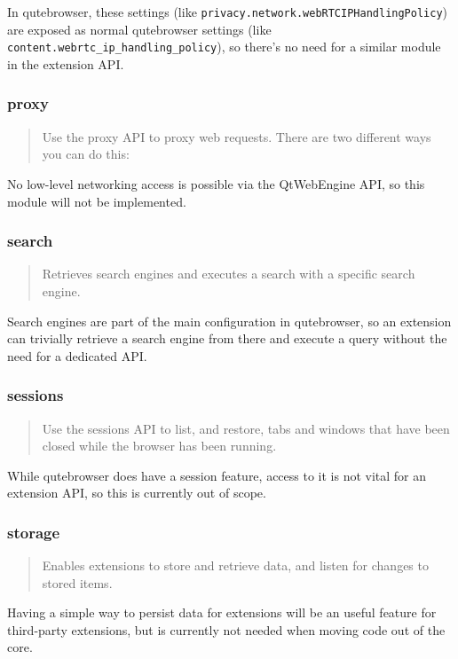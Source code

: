 In qutebrowser, these settings (like
\verb|privacy.network.webRTCIPHandlingPolicy|) are exposed as normal qutebrowser
settings (like \verb|content.webrtc_ip_handling_policy|), so there's no need
for a similar module in the extension API.

\subsubsection{proxy}
\begin{quote}
Use the proxy API to proxy web requests. There are two different ways you can do this:
\end{quote}

No low-level networking access is possible via the QtWebEngine API, so this
module will not be implemented.

\subsubsection{search}
\begin{quote}
Retrieves search engines and executes a search with a specific search engine.
\end{quote}

Search engines are part of the main configuration in qutebrowser, so an
extension can trivially retrieve a search engine from there and execute a query
without the need for a dedicated API.

\subsubsection{sessions}
\begin{quote}
Use the sessions API to list, and restore, tabs and windows that have been closed while the browser has been running.
\end{quote}

While qutebrowser does have a session feature, access to it is not vital for an
extension API, so this is currently out of scope.

\subsubsection{storage}
\begin{quote}
Enables extensions to store and retrieve data, and listen for changes to stored items.
\end{quote}

Having a simple way to persist data for extensions will be an useful feature for
third-party extensions, but is currently not needed when moving code out of the core.

